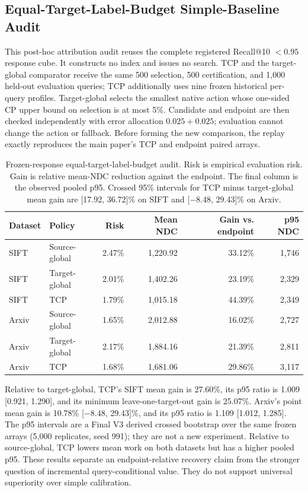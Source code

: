 \documentclass[sigconf,anonymous]{acmart}
\begin{document}
\subsection{Equal-Target-Label-Budget Simple-Baseline Audit}
This post-hoc attribution audit reuses the complete registered Recall@10 $<0.95$ response cube. It constructs no index and issues no search. TCP and the target-global comparator receive the same 500 selection, 500 certification, and 1,000 held-out evaluation queries; TCP additionally uses nine frozen historical per-query profiles. Target-global selects the smallest native action whose one-sided CP upper bound on selection is at most 5\%. Candidate and endpoint are then checked independently with error allocation $0.025+0.025$; evaluation cannot change the action or fallback. Before forming the new comparison, the replay exactly reproduces the main paper's TCP and endpoint paired arrays.

\begin{table}[t]
\caption{Frozen-response equal-target-label-budget audit. Risk is empirical evaluation risk. Gain is relative mean-NDC reduction against the endpoint. The final column is the observed pooled p95. Crossed 95\% intervals for TCP minus target-global mean gain are [17.92, 36.72]\% on SIFT and [$-8.48$, 29.43]\% on Arxiv.}
\label{tab:equal-info}
\small\begin{tabular*}{\textwidth}{@{\extracolsep{\fill}}llrrrr@{}}\toprule
Dataset & Policy & Risk & Mean NDC & Gain vs. endpoint & p95 NDC\\\midrule
SIFT & Source-global & 2.47\% & 1,220.92 & 33.12\% & 1,746\\
SIFT & Target-global & 2.01\% & 1,402.26 & 23.19\% & 2,329\\
SIFT & TCP & 1.79\% & 1,015.18 & 44.39\% & 2,349\\
Arxiv & Source-global & 1.65\% & 2,012.88 & 16.02\% & 2,727\\
Arxiv & Target-global & 2.17\% & 1,884.16 & 21.39\% & 2,811\\
Arxiv & TCP & 1.68\% & 1,681.06 & 29.86\% & 3,117\\\bottomrule
\end{tabular*}
\end{table}

Relative to target-global, TCP's SIFT mean gain is 27.60\%, its p95 ratio is 1.009 [0.921, 1.290], and its minimum leave-one-target-out gain is 25.07\%. Arxiv's point mean gain is 10.78\% [$-8.48$, 29.43]\%, and its p95 ratio is 1.109 [1.012, 1.285]. The p95 intervals are a Final V3 derived crossed bootstrap over the same frozen arrays (5,000 replicates, seed 991); they are not a new experiment. Relative to source-global, TCP lowers mean work on both datasets but has a higher pooled p95. These results separate an endpoint-relative recovery claim from the stronger question of incremental query-conditional value. They do not support universal superiority over simple calibration.
\end{document}
